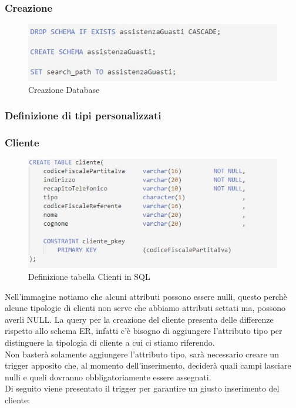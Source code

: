 \documentclass[legalpaper]{article}
\begin{document}
	\subsubsection{Creazione}
		\begin{figure}[h]
			\centering
			\includegraphics[width=0.5\linewidth]{Immagini SQL/creazioneSchemaDatabase}
			\caption{Creazione Database}
			\label{creazioneSchemaDatabasesql}
		\end{figure}

	\subsubsection{Definizione di tipi personalizzati}
	\subsubsection{Cliente}
		\begin{figure}[h]
			\centering
			\includegraphics[width=0.9\linewidth]{Immagini SQL/cliente}
			\caption{Definizione tabella Clienti in SQL}
			\label{clientesql}
		\end{figure}
		Nell'immagine notiamo che alcuni attributi possono essere nulli, questo perchè alcune tipologie di clienti non serve che abbiamo attributi 
		settati ma, possono averli NULL.
		La query per la creazione del cliente presenta delle differenze rispetto allo schema ER, 
		infatti c'è bisogno di aggiungere l'attributo tipo per distinguere la tipologia di cliente a cui ci stiamo riferendo. \\
		Non basterà solamente aggiungere l'attributo tipo, sarà necessario creare un trigger apposito che, al momento 
		dell'inserimento, deciderà quali campi lasciare nulli e queli dovranno obbligatoriamente essere assegnati. \\
		Di seguito viene presentato il trigger per garantire un giusto inserimento del cliente:\\
		
\end{document}
